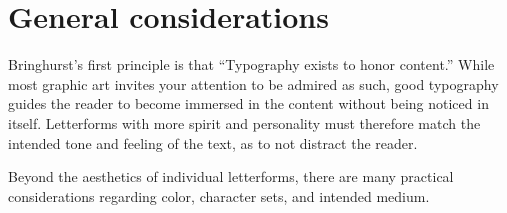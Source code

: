 \chapter{General considerations}

Bringhurst’s first principle is that “Typography exists to honor content.” While most graphic art invites your attention to be admired as such, good typography guides the reader to become immersed in the content without being noticed in itself. Letterforms with more spirit and personality must therefore match the intended tone and feeling of the text, as to not distract the reader. 

Beyond the aesthetics of individual letterforms, there are many practical considerations regarding color, character sets, and intended medium. 


